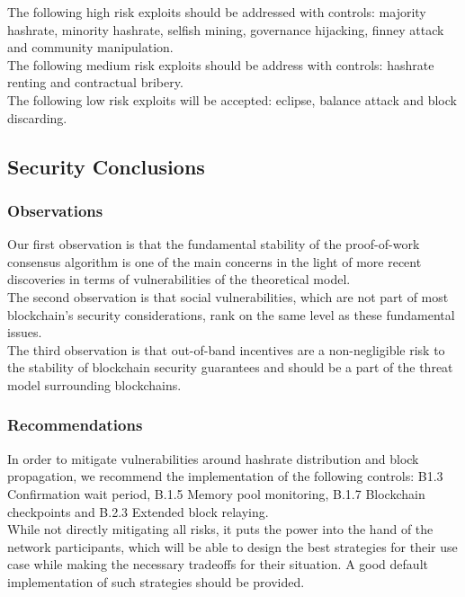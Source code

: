 \documentclass[12pt,a4paper]{article}
\begin{document}
The following high risk exploits should be addressed with controls: majority hashrate, minority hashrate, selfish mining, governance hijacking, finney attack and community manipulation.\\

The following medium risk exploits should be address with controls: hashrate renting and contractual bribery.\\

The following low risk exploits will be accepted: eclipse, balance attack and block discarding.\\

\subsection{Security Conclusions}

\subsubsection{Observations}

Our first observation is that the fundamental stability of the proof-of-work consensus algorithm is one of the main concerns in the light of more recent discoveries in terms of vulnerabilities of the theoretical model.\\

The second observation is that social vulnerabilities, which are not part of most blockchain's security considerations, rank on the same level as these fundamental issues.\\

The third observation is that out-of-band incentives are a non-negligible risk to the stability of blockchain security guarantees and should be a part of the threat model surrounding \glspl{blockchain}.\\

\subsubsection{Recommendations}

In order to mitigate vulnerabilities around hashrate distribution and block propagation, we recommend the implementation of the following controls: B1.3 Confirmation wait period, B.1.5 Memory pool monitoring, B.1.7 Blockchain checkpoints and B.2.3 Extended block relaying.\\

While not directly mitigating all risks, it puts the power into the hand of the network participants, which will be able to design the best strategies for their use case while making the necessary tradeoffs for their situation. A good default implementation of such strategies should be provided.\\
\end{document}
